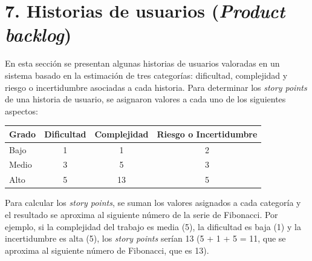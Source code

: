 \documentclass[
11pt, %
]{charter}
\begin{document}
\section{7. Historias de usuarios (\textit{Product backlog})}
\label{sec:backlog}

En esta sección se presentan algunas historias de usuarios valoradas en un sistema basado en la estimación de tres categorías: dificultad, complejidad y riesgo o incertidumbre asociadas a cada historia. Para determinar los \textit{story points} de una historia de usuario, se asignaron valores a cada uno de
los siguientes aspectos:

\begin{table}[htpb]
\centering
\begin{tabularx}{\linewidth}{|X|c|c|c|}
\hline
\rowcolor[HTML]{C0C0C0} 
\textbf{Grado} &
\textbf{Dificultad} &
\textbf{Complejidad} &
\textbf{Riesgo o Incertidumbre} \\ \hline
Bajo  &
 1&
 1 &
 2
\\ \hline
Medio  &
 3&
 5&
 3
 \\ \hline
Alto &
 5 &
 13 &
 5
\\ \hline
\end{tabularx}
\end{table}
Para calcular los \textit{story points}, se suman los valores asignados a cada categoría y el resultado se aproxima al siguiente número de la serie de Fibonacci. Por ejemplo, si la complejidad del trabajo es media (5), la dificultad es baja (1) y la incertidumbre es alta (5), los \textit{story points} serían 13 (5 + 1 + 5 = 11, que se aproxima al siguiente número de Fibonacci, que es 13).
\end{document}

